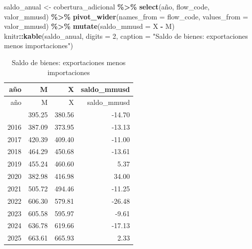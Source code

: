 \documentclass[
]{article}
\newenvironment{Shaded}{\begin{snugshade}}{\end{snugshade}}
\newcommand{\AttributeTok}[1]{\textcolor[rgb]{0.13,0.29,0.53}{#1}}
\newcommand{\DecValTok}[1]{\textcolor[rgb]{0.00,0.00,0.81}{#1}}
\newcommand{\FunctionTok}[1]{\textcolor[rgb]{0.13,0.29,0.53}{\textbf{#1}}}
\newcommand{\NormalTok}[1]{#1}
\newcommand{\OtherTok}[1]{\textcolor[rgb]{0.56,0.35,0.01}{#1}}
\newcommand{\SpecialCharTok}[1]{\textcolor[rgb]{0.81,0.36,0.00}{\textbf{#1}}}
\newcommand{\StringTok}[1]{\textcolor[rgb]{0.31,0.60,0.02}{#1}}
\begin{document}
\begin{Shaded}
\begin{Highlighting}[]
\NormalTok{saldo\_anual }\OtherTok{\textless{}{-}}\NormalTok{ cobertura\_adicional }\SpecialCharTok{\%\textgreater{}\%}
  \FunctionTok{select}\NormalTok{(año, flow\_code, valor\_mmusd) }\SpecialCharTok{\%\textgreater{}\%}
  \FunctionTok{pivot\_wider}\NormalTok{(}\AttributeTok{names\_from =}\NormalTok{ flow\_code, }\AttributeTok{values\_from =}\NormalTok{ valor\_mmusd) }\SpecialCharTok{\%\textgreater{}\%}
  \FunctionTok{mutate}\NormalTok{(}\AttributeTok{saldo\_mmusd =}\NormalTok{ X }\SpecialCharTok{{-}}\NormalTok{ M)}
\NormalTok{knitr}\SpecialCharTok{::}\FunctionTok{kable}\NormalTok{(saldo\_anual, }\AttributeTok{digits =} \DecValTok{2}\NormalTok{,}
             \AttributeTok{caption =} \StringTok{"Saldo de bienes: exportaciones menos importaciones"}\NormalTok{)}
\end{Highlighting}
\end{Shaded}

\begin{longtable}[]{@{}rrrr@{}}
\caption{Saldo de bienes: exportaciones menos
importaciones}\tabularnewline
\toprule\noalign{}
año & M & X & saldo\_mmusd \\
\midrule\noalign{}
\endfirsthead
\toprule\noalign{}
año & M & X & saldo\_mmusd \\
\midrule\noalign{}
\endhead
\bottomrule\noalign{}
\endlastfoot
2015 & 395.25 & 380.56 & -14.70 \\
2016 & 387.09 & 373.95 & -13.13 \\
2017 & 420.39 & 409.40 & -11.00 \\
2018 & 464.29 & 450.68 & -13.61 \\
2019 & 455.24 & 460.60 & 5.37 \\
2020 & 382.98 & 416.98 & 34.00 \\
2021 & 505.72 & 494.46 & -11.25 \\
2022 & 606.30 & 579.81 & -26.48 \\
2023 & 605.58 & 595.97 & -9.61 \\
2024 & 636.78 & 619.66 & -17.13 \\
2025 & 663.61 & 665.93 & 2.33 \\
\end{longtable}
\end{document}

